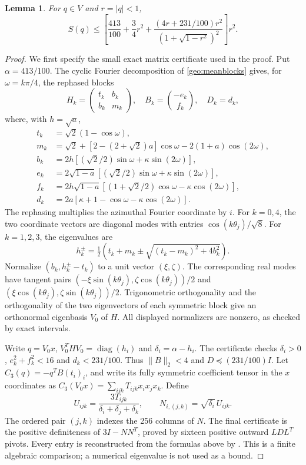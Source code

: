 \documentclass[12pt,reqno]{amsart}
\newtheorem{lemma}[theorem]{Lemma}
\theoremstyle{definition}
\numberwithin{equation}{section}
\begin{document}
\begin{lemma}\label{geo:mean}
For $q\in V$ and $r=|q|<1$,
\[
 S(q)\le\left[\frac{413}{100}+\frac34r^2+
 \frac{(4r+231/100)r^2}{(1+\sqrt{1-r^2})^2}\right]r^2.
\]
\end{lemma}
\begin{proof}
We first specify the small exact matrix certificate used in the proof.
Put $\alpha=413/100$. The cyclic Fourier decomposition of
\eqref{geo:meanblocks} gives, for $\omega=k\pi/4$, the rephased blocks
\[
 H_k=\begin{pmatrix}t_k&b_k\\b_k&m_k\end{pmatrix},\quad
 B_k=\binom{-e_k}{f_k},\quad D_k=d_k,
\]
where, with $h=\sqrt a$,
\begin{align*}
 t_k&=\sqrt2(1-\cos\omega),\\
 m_k&=\sqrt2+[2-(2+\sqrt2)a]\cos\omega-2(1+a)\cos(2\omega),\\
 b_k&=2h[(\sqrt2/2)\sin\omega+\kappa\sin(2\omega)],\\
 e_k&=2\sqrt{1-a}[(\sqrt2/2)\sin\omega+\kappa\sin(2\omega)],\\
 f_k&=2h\sqrt{1-a}[(1+\sqrt2/2)\cos\omega-\kappa\cos(2\omega)],\\
 d_k&=2a[\kappa+1-\cos\omega-\kappa\cos(2\omega)].
\end{align*}
The rephasing multiplies the azimuthal Fourier coordinate by $i$.
For $k=0,4$, the two coordinate vectors are diagonal modes with
entries $\cos(k\theta_j)/\sqrt8$. For $k=1,2,3$, the eigenvalues are
\[
 h_k^\pm=\tfrac12(t_k+m_k\pm\sqrt{(t_k-m_k)^2+4b_k^2}).
\]
Normalize $(b_k,h_k^\pm-t_k)$ to a unit vector $(\xi,\zeta)$.
The corresponding real modes have tangent pairs
$(-\xi\sin(k\theta_j),\zeta\cos(k\theta_j))/2$ and
$(\xi\cos(k\theta_j),\zeta\sin(k\theta_j))/2$.
Trigonometric orthogonality and the orthogonality of the two eigenvectors
of each symmetric block give an orthonormal eigenbasis $V_0$ of $H$.
All displayed normalizers are nonzero, as checked by exact intervals.

Write $q=V_0x$, $V_0^THV_0=\operatorname{diag}(h_i)$ and
$\delta_i=\alpha-h_i$. The certificate checks $\delta_i>0$,
$e_k^2+f_k^2<16$ and $d_k<231/100$. Thus
$\|B\|_2<4$ and $D\preceq(231/100)I$.
Let $C_3(q)=-q^TB(t_i)_i$, and write its fully symmetric coefficient
tensor in the $x$ coordinates as $C_3(V_0x)=\sum_{ijk}T_{ijk}x_ix_jx_k$.
Define
\[
 U_{ijk}=\frac{3T_{ijk}}{\delta_i+\delta_j+\delta_k},\qquad
 N_{i,(j,k)}=\sqrt{\delta_i}\,U_{ijk}.
\]
The ordered pair $(j,k)$ indexes the 256 columns of $N$. The final
certificate is the positive definiteness of $3I-NN^T$, proved by
sixteen positive outward $LDL^T$ pivots. Every entry is reconstructed
from the formulas above by
.
This is a finite algebraic comparison; a numerical eigenvalue is not
used as a bound.


\end{proof}
\end{document}
